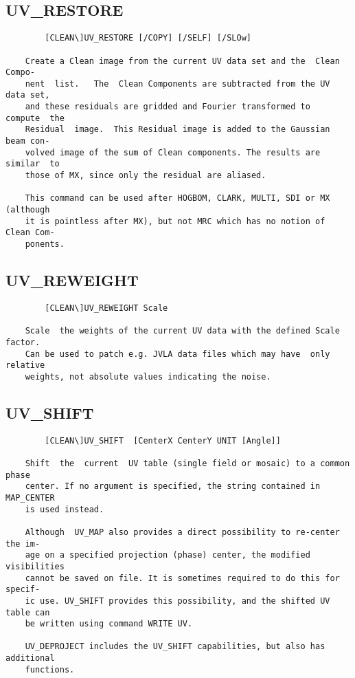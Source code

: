 \subsection{UV\_RESTORE}
\begin{verbatim}
        [CLEAN\]UV_RESTORE [/COPY] [/SELF] [/SLOw]

    Create a Clean image from the current UV data set and the  Clean  Compo-
    nent  list.   The  Clean Components are subtracted from the UV data set,
    and these residuals are gridded and Fourier transformed to  compute  the
    Residual  image.  This Residual image is added to the Gaussian beam con-
    volved image of the sum of Clean components. The results are similar  to
    those of MX, since only the residual are aliased.

    This command can be used after HOGBOM, CLARK, MULTI, SDI or MX (although
    it is pointless after MX), but not MRC which has no notion of Clean Com-
    ponents.

\end{verbatim}
\subsection{UV\_REWEIGHT}
\begin{verbatim}
        [CLEAN\]UV_REWEIGHT Scale

    Scale  the weights of the current UV data with the defined Scale factor.
    Can be used to patch e.g. JVLA data files which may have  only  relative
    weights, not absolute values indicating the noise.

\end{verbatim}
\subsection{UV\_SHIFT}
\begin{verbatim}
        [CLEAN\]UV_SHIFT  [CenterX CenterY UNIT [Angle]]

    Shift  the  current  UV table (single field or mosaic) to a common phase
    center. If no argument is specified, the string contained in  MAP_CENTER
    is used instead.

    Although  UV_MAP also provides a direct possibility to re-center the im-
    age on a specified projection (phase) center, the modified  visibilities
    cannot be saved on file. It is sometimes required to do this for specif-
    ic use. UV_SHIFT provides this possibility, and the shifted UV table can
    be written using command WRITE UV.

    UV_DEPROJECT includes the UV_SHIFT capabilities, but also has additional
    functions.

\end{verbatim}
